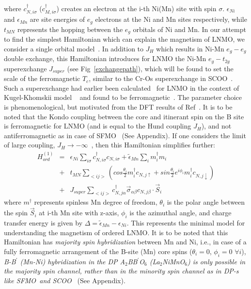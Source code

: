 \documentclass[english,aps,prb,twocolumn,showpacs]{revtex4-1}
\begin{document}
where $c_{N,i\sigma}^{\dagger}$ ($c_{M,i\sigma}^{\dagger}$) creates an electron at the i-th Ni(Mn) site 
with spin $\sigma$. $\epsilon_{Ni}$ and $\epsilon_{Mn}$ are site energies of $e_{g}$ electrons 
at the Ni and Mn sites respectively, while $t_{MN}$ represents the hopping between the $e_{g}$ orbitals of Ni and Mn. 
In our attempt to find the simplest Hamiltonian which can explain the magnetism of LNMO,
 we consider a single orbital model~\cite{singleorb}. In addition to $J_{H}$ which results in Ni-Mn $e_{g}-e_{g}$ double exchange,
 this Hamiltonian introduces for LNMO the
 Ni-Mn $e_{g}-t_{2g}$ superexchange $J_{super}$ 
(see Fig~\ref{exchangepath}), 
which will be found to set the scale of the ferromagnetic
 $T_{c}$, similar to the Cr-Os superexchange in SCOO~\cite{Mohit}.
 Such a superexchange had earlier been calculated~\cite{Tanusri} for LNMO in the context of Kugel-Khomskii model
~\cite{Kugel-Khomskii} and found to be ferromagnetic~\cite{superJ1J2}. The parameter choice is phenomenological, 
but motivated from the DFT results of Ref~\cite{Tanusri}.
 It is to be noted that the Kondo coupling  between the 
core and itinerant spin on the B site is ferromagnetic for LNMO (and is equal to the Hund coupling $J_{H}$),
 and not antiferromagnetic as in case of SFMO~\cite{Millis,mePinaki} (See Appendix). If one considers
 the limit of large coupling, $J_{H}\rightarrow-\infty$~\cite{JHinfty,AndHas,DeGennes}, then this Hamiltonian simplifies further:
\begin{eqnarray}
H^{(1)}_{ord}&=&\epsilon_{Ni}\sum_{i\sigma}c_{N,i\sigma}^{\dagger}c_{N,i\sigma}+\tilde{\epsilon}_{Mn}\sum_{i}m_{i}^{\dagger}m_{i} \nonumber \\
 &+&t_{MN}\sum_{<ij>}(cos\frac{\theta_{i}}{2}m_{i}^{\dagger}c_{N,j\uparrow}+sin\frac{\theta_{i}}{2}e^{i\phi_{i}}m_{i}^{\dagger}c_{N,j\downarrow}) \nonumber \\
 &+&J_{super}\sum_{<ij>} c_{N,j\alpha}^{\dagger}\vec{\sigma}_{\alpha\beta}c_{N,j\beta}\cdot \vec{S}_{i} 
\label{Jinfty}
\end{eqnarray}
where $m^{\dagger}$ represents spinless Mn degree of freedom, $\theta_{i}$ is the polar angle between the spin $\vec{S}_{i}$ at i-th Mn site with z-axis, $\phi_{i}$ is the azimuthal angle, and
charge transfer energy is given by $\Delta=\tilde{\epsilon}_{Mn}-\epsilon_{Ni}$.
 This represents the minimal model for understanding
the magnetism of ordered LNMO. It is to be noted that this Hamiltonian has
{\em majority spin hybridization} between Mn and Ni, i.e., in case of a fully ferromagnetic arrangement 
 of the B-site (Mn) core spins ($\theta_{i}=0$, $\phi_{i}=0$ $\forall i$), {\em B-B$^{\prime}$ (Mn-Ni) hybridization 
  in the DP A$_{2}$BB$^{\prime}$O$_{6}$ (La$_{2}$NiMnO$_{6}$) is only possible in the majority spin channel,
 rather than in the minority spin channel as in 
 DP-s like SFMO~\cite{FGuinea}and SCOO~\cite{Sr2CrOsO6}} (See Appendix). 
\end{document}
